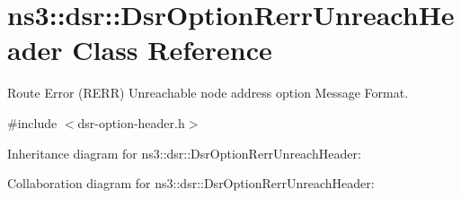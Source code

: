 \hypertarget{classns3_1_1dsr_1_1DsrOptionRerrUnreachHeader}{}\section{ns3\+:\+:dsr\+:\+:Dsr\+Option\+Rerr\+Unreach\+Header Class Reference}
\label{classns3_1_1dsr_1_1DsrOptionRerrUnreachHeader}


Route Error (R\+E\+RR) Unreachable node address option Message Format.  




{\ttfamily \#include $<$dsr-\/option-\/header.\+h$>$}



Inheritance diagram for ns3\+:\+:dsr\+:\+:Dsr\+Option\+Rerr\+Unreach\+Header\+:


Collaboration diagram for ns3\+:\+:dsr\+:\+:Dsr\+Option\+Rerr\+Unreach\+Header\+:
